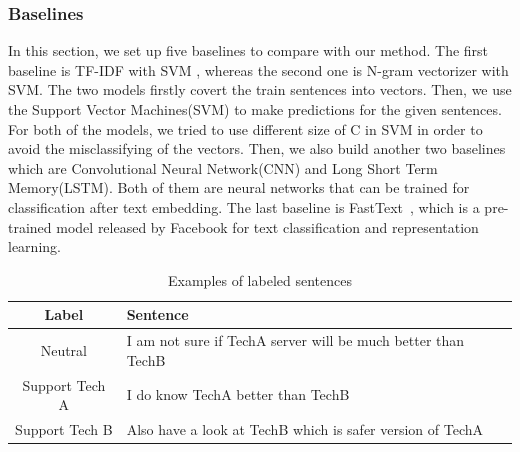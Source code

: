 \subsubsection{Baselines}
In this section, we set up five baselines to compare with our method. The first baseline is TF-IDF\cite{sparck1972statistical} with SVM \cite{Cortes1995}, whereas the second one is N-gram vectorizer with SVM. The two models firstly covert the train sentences into vectors. Then, we use the Support Vector Machines(SVM) to make predictions for the given sentences. For both of the models, we tried to use different size of C in SVM in order to avoid the misclassifying of the vectors. Then, we also build another two baselines which are Convolutional Neural Network(CNN) and Long Short Term Memory(LSTM). Both of them are neural networks that can be trained for classification after text embedding. The last baseline is FastText~\cite{joulin2016fasttext}, which is a pre-trained model released by Facebook for text classification and representation learning.
\begin{table}
	\scriptsize
	\center	
	\caption{Examples of labeled sentences }
	\vspace{-4mm}
	\begin{tabular}{c |l}
		\hline
		\textbf{Label} & \textbf{Sentence} \\
		\hline
        \multirow{1}{*}{Neutral} & I am not sure if TechA server will be much better than TechB\\
        \hline
        \multirow{1}{*}{Support Tech A} & I do know TechA better than TechB\\
        \hline
        \multirow{1}{*}{Support Tech B} & Also have a look at TechB which is safer version of TechA\\
				\hline
	\end{tabular}
	\vspace{-3mm}
	\label{tab:label}
\end{table}
